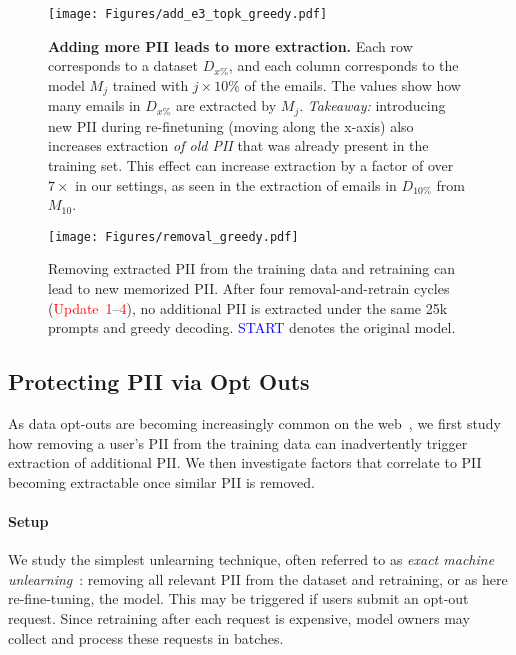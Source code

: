 \begin{figure}[t]
  \centering
  \texttt{[image: Figures/add\_e3\_topk\_greedy.pdf]}
  \vspace{-1em}
  \caption{\textbf{Adding more PII leads to more extraction.} Each row corresponds to a dataset $D_{x\%}$, and each column corresponds to the model $M_j$ trained with $j\times 10\%$ of the emails. The values show how many emails in $D_{x\%}$ are extracted by $M_j$. 
  \textit{Takeaway:} introducing new PII during re-finetuning (moving along the x-axis) also increases extraction \emph{of old PII} that was already present in the training set. This effect can increase extraction by a factor of over $7\times$ in our settings, as seen in the extraction of emails in $D_{10\%}$ from $M_{10}$.}
  \label{fig:add_topk_greedy_e3}
\end{figure}






 


\begin{figure}[t]
  \centering
  \texttt{[image: Figures/removal\_greedy.pdf]}
  \caption{Removing extracted PII from the training data and retraining can lead to new memorized PII. 
  After four removal-and-retrain cycles (\textcolor{red}{Update~1}--\textcolor{red}{4}), 
  no additional PII is extracted under the same 25k prompts and greedy decoding. 
  \textcolor{blue}{START} denotes the original model.}
  \vspace{-1em}
  \label{fig:onion}
\end{figure}


\subsection{Protecting PII via Opt Outs}
\label{section:onion}

As data opt-outs are becoming increasingly common on the web~\citep{linkedinoptout}, %
we first study how removing a user's PII from the training data can inadvertently trigger extraction of additional PII.
We then investigate factors that correlate to PII becoming extractable once similar PII is removed. %


\paragraph{Setup}
\label{subsec:ppi_setup}
We study the simplest unlearning technique, often referred to as \emph{exact machine unlearning}~\citep{bourtoule2021machine}: removing all relevant PII from the dataset and retraining, or as here re-fine-tuning, the model.
This may be triggered if users submit an opt-out request.
Since retraining after each request is expensive, %
model owners may collect and process these requests in batches.


